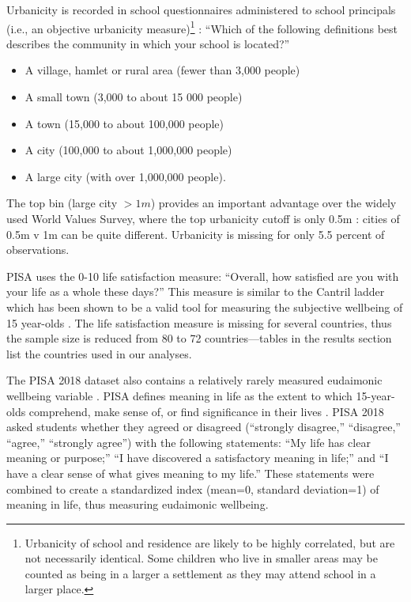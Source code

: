 \documentclass[10pt, letterpaper]{article}
\begin{document}
\begin{spacing}{1.4}
Urbanicity is recorded in school questionnaires administered to school
principals (i.e., an objective urbanicity measure)\footnote{Urbanicity of school
  and residence are likely to be highly correlated, but are not necessarily
  identical. Some children who live in smaller areas may be counted as being in
  a larger a settlement as they may attend school in a larger place.
}%
: ``Which of the following definitions best describes the community in which your school is located?''
\begin{itemize}
\item A village, hamlet or rural area (fewer than 3,000 people)
\item A small town (3,000 to about 15 000 people)
\item A town (15,000 to about 100,000 people)
\item A city (100,000 to about 1,000,000 people)
\item A large city (with over 1,000,000 people). 
\end{itemize}

The top bin (large city $>1m$) provides an important advantage over the widely
used World Values Survey, where the top urbanicity cutoff is only 0.5m
\citep{deb23,ebshoy24}: cities of 0.5m v 1m can be quite different.  Urbanicity is missing for only 5.5 percent of
observations. 

PISA uses the 0-10 life satisfaction measure: ``Overall, how satisfied are you with
your life as a whole these days?''
 This measure is similar to the Cantril ladder which has been shown to be a valid tool for
measuring the subjective wellbeing of 15 year-olds \citep{levin2014reliability}.
 The life satisfaction measure is missing for several countries, thus the sample size is reduced from 80 to 72 countries---tables in the results section list the countries used in our analyses. 

The PISA 2018 dataset also contains a relatively rarely measured eudaimonic wellbeing variable \citep[see][]{proctor16}. PISA defines meaning in life as the extent to which 15-year-olds comprehend, make sense of, or find significance in their lives \citep{pisa18}. PISA 2018 asked students whether they agreed or disagreed (``strongly disagree,'' ``disagree,'' ``agree,'' ``strongly agree'') with the following
statements: ``My life has clear meaning or purpose;'' ``I have discovered a
satisfactory meaning in life;'' and ``I have a clear sense of what gives meaning
to my life.'' These statements were combined to create a standardized index (mean=0, standard deviation=1) of meaning in life, thus measuring eudaimonic wellbeing. 



\end{spacing}
\end{document}
